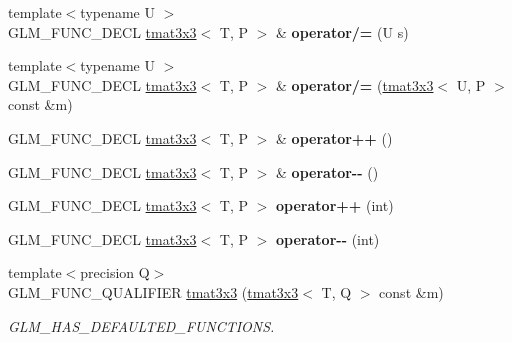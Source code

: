 \begin{DoxyCompactItemize}
\mbox{\label{structglm_1_1tmat3x3_ad05055d1d22efff71a9f4b98f6f649fd}} 
{\footnotesize template$<$typename U $>$ }\\G\+L\+M\+\_\+\+F\+U\+N\+C\+\_\+\+D\+E\+CL \hyperlink{structglm_1_1tmat3x3}{tmat3x3}$<$ T, P $>$ \& {\bfseries operator/=} (U s)
\item 
\mbox{\label{structglm_1_1tmat3x3_a890dc9c4a08a6439357222ae650a0222}} 
{\footnotesize template$<$typename U $>$ }\\G\+L\+M\+\_\+\+F\+U\+N\+C\+\_\+\+D\+E\+CL \hyperlink{structglm_1_1tmat3x3}{tmat3x3}$<$ T, P $>$ \& {\bfseries operator/=} (\hyperlink{structglm_1_1tmat3x3}{tmat3x3}$<$ U, P $>$ const \&m)
\item 
\mbox{\label{structglm_1_1tmat3x3_abf574c05769a6e30060fceee846cc823}} 
G\+L\+M\+\_\+\+F\+U\+N\+C\+\_\+\+D\+E\+CL \hyperlink{structglm_1_1tmat3x3}{tmat3x3}$<$ T, P $>$ \& {\bfseries operator++} ()
\item 
\mbox{\label{structglm_1_1tmat3x3_ae5483abbd6a2e5d7698aa6cbd0e1f8c8}} 
G\+L\+M\+\_\+\+F\+U\+N\+C\+\_\+\+D\+E\+CL \hyperlink{structglm_1_1tmat3x3}{tmat3x3}$<$ T, P $>$ \& {\bfseries operator-\/-\/} ()
\item 
\mbox{\label{structglm_1_1tmat3x3_a4065f5ff3fe1b587e329700e69d5d453}} 
G\+L\+M\+\_\+\+F\+U\+N\+C\+\_\+\+D\+E\+CL \hyperlink{structglm_1_1tmat3x3}{tmat3x3}$<$ T, P $>$ {\bfseries operator++} (int)
\item 
\mbox{\label{structglm_1_1tmat3x3_a976b9d2832d53ea5049e9e86f6bf8323}} 
G\+L\+M\+\_\+\+F\+U\+N\+C\+\_\+\+D\+E\+CL \hyperlink{structglm_1_1tmat3x3}{tmat3x3}$<$ T, P $>$ {\bfseries operator-\/-\/} (int)
\item 
\mbox{\label{structglm_1_1tmat3x3_a7d0662c2d46d1709c245e21181f3adff}} 
{\footnotesize template$<$precision Q$>$ }\\G\+L\+M\+\_\+\+F\+U\+N\+C\+\_\+\+Q\+U\+A\+L\+I\+F\+I\+ER \hyperlink{structglm_1_1tmat3x3_a7d0662c2d46d1709c245e21181f3adff}{tmat3x3} (\hyperlink{structglm_1_1tmat3x3}{tmat3x3}$<$ T, Q $>$ const \&m)
\begin{DoxyCompactList}\small\item\em G\+L\+M\+\_\+\+H\+A\+S\+\_\+\+D\+E\+F\+A\+U\+L\+T\+E\+D\+\_\+\+F\+U\+N\+C\+T\+I\+O\+NS. \end{DoxyCompactList}\item 

\end{DoxyCompactItemize}
